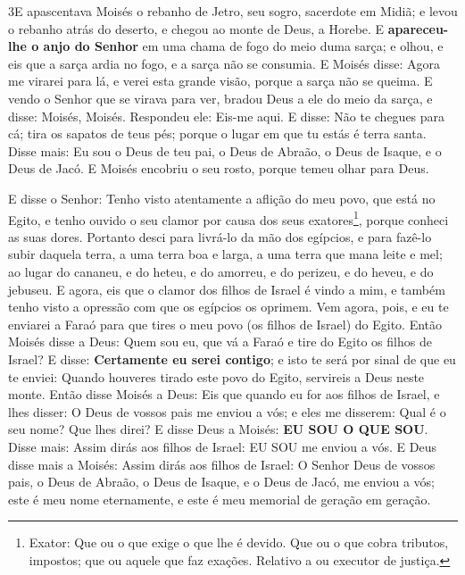 \medskip

\lettrine{3} E apascentava Moisés o rebanho de Jetro, seu
sogro, sacerdote em Midiã; e levou o rebanho atrás do deserto, e
chegou ao monte de Deus, a Horebe. E \textbf{apareceu-lhe o anjo
do Senhor} em uma chama de fogo do meio duma sarça; e olhou, e eis
que a sarça ardia no fogo, e a sarça não se consumia. E Moisés
disse: Agora me virarei para lá, e verei esta grande visão, porque a
sarça não se queima. E vendo o Senhor que se virava para ver,
bradou Deus a ele do meio da sarça, e disse: Moisés, Moisés.
Respondeu ele: Eis-me aqui. E disse: Não te chegues para cá;
tira os sapatos de teus pés; porque o lugar em que tu estás é terra
santa. Disse mais: Eu sou o Deus de teu pai, o Deus de Abraão, o
Deus de Isaque, e o Deus de Jacó. E Moisés encobriu o seu rosto,
porque temeu olhar para Deus.

E disse o Senhor: Tenho visto atentamente a aflição do meu povo,
que está no Egito, e tenho ouvido o seu clamor por causa dos seus
exatores\footnote{Exator: Que ou o que exige o que lhe é devido. Que
ou o que cobra tributos, impostos; que ou aquele que faz exações.
Relativo a ou executor de justiça.}, porque conheci as suas dores.
Portanto desci para livrá-lo da mão dos egípcios, e para fazê-lo
subir daquela terra, a uma terra boa e larga, a uma terra que mana
leite e mel; ao lugar do cananeu, e do heteu, e do amorreu, e do
perizeu, e do heveu, e do jebuseu. E agora, eis que o clamor dos
filhos de Israel é vindo a mim, e também tenho visto a opressão com
que os egípcios os oprimem. Vem agora, pois, e eu te enviarei
a Faraó para que tires o meu povo (os filhos de Israel) do Egito.
Então Moisés disse a Deus: Quem sou eu, que vá a Faraó e tire
do Egito os filhos de Israel? E disse: \textbf{Certamente eu
serei contigo}; e isto te será por sinal de que eu te enviei: Quando
houveres tirado este povo do Egito, servireis a Deus neste monte.
Então disse Moisés a Deus: Eis que quando eu for aos filhos
de Israel, e lhes disser: O Deus de vossos pais me enviou a vós; e
eles me disserem: Qual é o seu nome? Que lhes direi? E disse
Deus a Moisés: \textbf{EU SOU O QUE SOU}. Disse mais: Assim dirás
aos filhos de Israel: EU SOU me enviou a vós. E Deus disse
mais a Moisés: Assim dirás aos filhos de Israel: O Senhor Deus de
vossos pais, o Deus de Abraão, o Deus de Isaque, e o Deus de Jacó,
me enviou a vós; este é meu nome eternamente, e este é meu memorial
de geração em geração.

